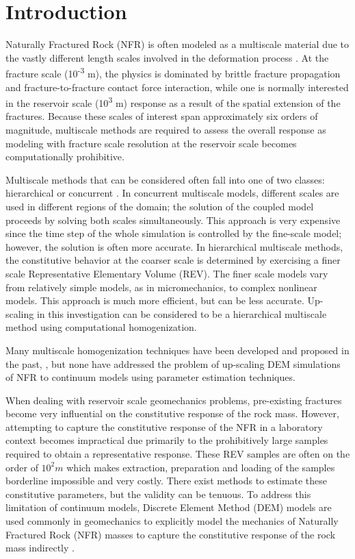 \section{Introduction}
Naturally Fractured Rock (NFR) is often modeled as a multiscale material due to the vastly different length scales involved in the deformation process \citep{zhou_flow_2003}. At the fracture scale (10\textsuperscript{-3} m), the physics is dominated by brittle fracture propagation and fracture-to-fracture contact force interaction, while one is normally interested in the reservoir scale (10\textsuperscript{3} m) response as a result of the spatial extension of the fractures. Because these scales of interest span approximately six orders of magnitude, multiscale methods are required to assess the overall response as modeling with fracture scale resolution at the reservoir scale becomes computationally prohibitive.

Multiscale methods that can be considered often fall into one of two classes: hierarchical or concurrent \citep{Gracie_2011}. In concurrent multiscale models, different scales are used in different regions of the domain; the solution of the coupled model proceeds by solving both scales simultaneously. This approach is very expensive since the time step of the whole simulation is controlled by the fine-scale model; however, the solution is often more accurate. In hierarchical multiscale methods, the constitutive behavior at the coarser scale is determined by exercising a finer scale Representative Elementary Volume (REV). The finer scale models vary from relatively simple models, as in micromechanics, to complex nonlinear models. This approach is much more efficient, but can be less accurate. Up-scaling in this investigation can be considered to be a hierarchical multiscale method using computational homogenization. 

Many multiscale homogenization techniques have been developed and proposed in the past, \citep{Aanonsen_2006,Temizer_2009,Loehnert_2005}, but none have addressed the problem of up-scaling DEM simulations of NFR to continuum models using parameter estimation techniques.

When dealing with reservoir scale geomechanics problems, pre-existing fractures become very influential on the constitutive response of the rock mass. However, attempting to capture the constitutive response of the NFR in a laboratory context becomes impractical due primarily to the prohibitively large samples required to obtain a representative response. These REV samples are often on the order of $10^2m$ which makes extraction, preparation and loading of the samples borderline impossible and very costly. There exist methods to estimate these constitutive parameters, but the validity can be tenuous. To address this limitation of continuum models, Discrete Element Method (DEM) models are used commonly in geomechanics to explicitly model the mechanics of Naturally Fractured Rock (NFR) masses to capture the constitutive response of the rock mass indirectly \citep{jing_review_2003}. 


